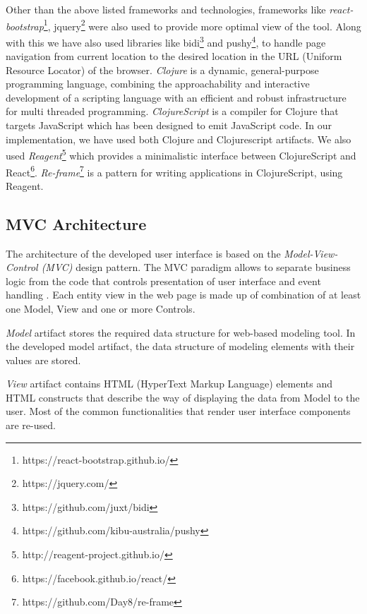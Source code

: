 Other than the above listed frameworks and technologies, frameworks like \textit{react-bootstrap}\footnote{https://react-bootstrap.github.io/}, jquery\footnote{https://jquery.com/} were also used to provide more optimal view of the tool. Along with this we have also used libraries like bidi\footnote{https://github.com/juxt/bidi} and pushy\footnote{https://github.com/kibu-australia/pushy}, to handle page navigation from current location to the desired location in the URL (Uniform Resource Locator) of the browser. \textit{Clojure} is a dynamic, general-purpose programming language, combining the approachability and interactive development of a scripting language with an efficient and robust infrastructure for multi threaded programming. \textit{ClojureScript} is a compiler for Clojure that targets JavaScript which has been designed to emit JavaScript code. In our implementation, we have used both Clojure and Clojurescript artifacts. We also used \textit{Reagent}\footnote{http://reagent-project.github.io/} which provides a minimalistic interface between ClojureScript and React\footnote{https://facebook.github.io/react/}. \textit{Re-frame}\footnote{https://github.com/Day8/re-frame} is a pattern for writing applications in ClojureScript, using Reagent.

\subsection{MVC Architecture}
\label{subsec:mvcarch}
The architecture of the developed user interface is based on the \textit{Model-View-Control (MVC)} design pattern. The MVC paradigm allows to separate business logic from the code that controls presentation of user interface and event handling \cite{Oracle2016}. Each entity view in the web page is made up of combination of at least one Model, View and one or more Controls. 

\textit{Model} artifact stores the required data structure for web-based modeling tool. In the developed model artifact, the data structure of modeling elements with their values are stored. 

\textit{View} artifact contains HTML (HyperText Markup Language) elements and HTML constructs that describe the way of displaying the data from Model to the user. Most of the common functionalities that render user interface components are re-used. 

